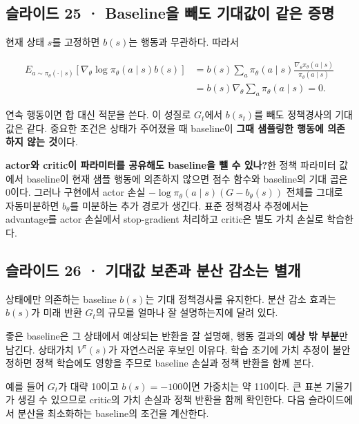 \documentclass[11pt,a4paper]{article}
\begin{document}
\subsection{슬라이드 25 · Baseline을 빼도 기대값이 같은 증명}

현재 상태 $s$를 고정하면 $b(s)$는 행동과 무관하다. 따라서\par

\[
\begin{aligned}
E_{a\sim\pi_\theta(\cdot\mid s)}
[\nabla_\theta\log\pi_\theta(a\mid s)b(s)]
&=b(s)\sum_a\pi_\theta(a\mid s)
\frac{\nabla_\theta\pi_\theta(a\mid s)}
{\pi_\theta(a\mid s)}\\
&=b(s)\nabla_\theta\sum_a\pi_\theta(a\mid s)=0.
\end{aligned}
\]

연속 행동이면 합 대신 적분을 쓴다. 이 성질로 $G_t$에서 $b(s_t)$를 빼도 정책경사의 기대값은 같다. 중요한 조건은 상태가 주어졌을 때 baseline이 \textbf{그때 샘플링한 행동에 의존하지 않는 것}이다.\par

\par\medskip\noindent\textbf{actor와 critic이 파라미터를 공유해도 baseline을 뺄 수 있나?}\quad 한 정책 파라미터 값에서 baseline이 현재 샘플 행동에 의존하지 않으면 점수 함수와 baseline의 기대 곱은 0이다. 그러나 구현에서 actor 손실 $-\log\pi_\theta(a\mid s)(G-b_\theta(s))$ 전체를 그대로 자동미분하면 $b_\theta$를 미분하는 추가 경로가 생긴다. 표준 정책경사 추정에서는 advantage를 actor 손실에서 stop-gradient 처리하고 critic은 별도 가치 손실로 학습한다.\par

\subsection{슬라이드 26 · 기대값 보존과 분산 감소는 별개}

상태에만 의존하는 baseline $b(s)$는 기대 정책경사를 유지한다. 분산 감소 효과는 $b(s)$가 미래 반환 $G_t$의 규모를 얼마나 잘 설명하는지에 달려 있다.\par

좋은 baseline은 그 상태에서 예상되는 반환을 잘 설명해, 행동 결과의 \textbf{예상 밖 부분}만 남긴다. 상태가치 $V^\pi(s)$가 자연스러운 후보인 이유다. 학습 초기에 가치 추정이 불안정하면 정책 학습에도 영향을 주므로 baseline 손실과 정책 반환을 함께 본다.\par

예를 들어 $G_t$가 대략 10이고 $b(s)=-100$이면 가중치는 약 110이다. 큰 표본 기울기가 생길 수 있으므로 critic의 가치 손실과 정책 반환을 함께 확인한다. 다음 슬라이드에서 분산을 최소화하는 baseline의 조건을 계산한다.\par
\end{document}
